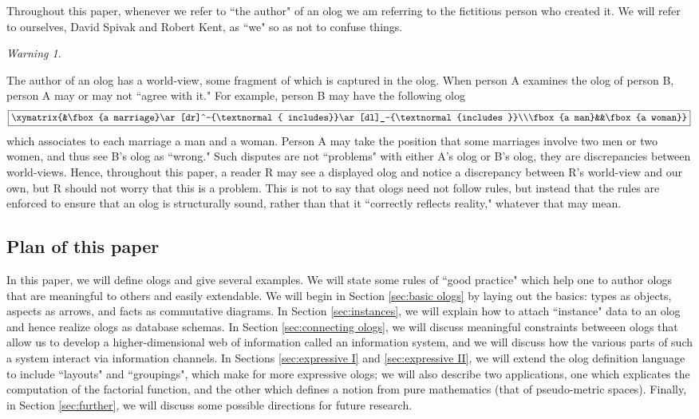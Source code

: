 \documentclass{amsart}
\newcommand{\LA}[2]{\ar[#1]^-{\tn {#2}}}
\newcommand{\LAL}[2]{\ar[#1]_-{\tn {#2}}}
\theoremstyle{remark}
\newtheorem{warning}[theorem]{Warning}
\theoremstyle{definition}
\def\tn{\textnormal}
\begin{document}
Throughout this paper, whenever we refer to ``the author" of an olog we am referring to the fictitious person who created it. We will refer to ourselves, David Spivak and Robert Kent, as ``we" so as not to confuse things. 

\begin{warning}\label{warn:world-view}

The author of an olog has a world-view, some fragment of which is captured in the olog. When person A examines the olog of person B, person A may or may not ``agree with it."  For example, person B may have the following olog $$\fbox{\xymatrix{&\fbox{a marriage}\LA{dr}{ includes}\LAL{dl}{includes }\\\fbox{a man}&&\fbox{a woman}}}$$ which associates to each marriage a man and a woman. Person A may take the position that some marriages involve two men or two women, and thus see B's olog as ``wrong."  Such disputes are not ``problems" with either A's olog or B's olog, they are discrepancies between world-views. Hence, throughout this paper, a reader R may see a displayed olog and notice a discrepancy between R's world-view and our own, but R should not worry that this is a problem. This is not to say that ologs need not follow rules, but instead that the rules are enforced to ensure that an olog is structurally sound, rather than that it ``correctly reflects reality," whatever that may mean.

\end{warning}

\subsection{Plan of this paper}

In this paper, we will define ologs and give several examples. We will state some rules of ``good practice" which help one to author ologs that are meaningful to others and easily extendable. We will begin in Section \ref{sec:basic ologs} by laying out the basics: types as objects, aspects as arrows, and facts as commutative diagrams. In Section \ref{sec:instances}, we will explain how to attach ``instance" data to an olog and hence realize ologs as database schemas. In Section \ref{sec:connecting ologs}, we will discuss meaningful constraints betweeen ologs that allow us to develop a higher-dimensional web of information called an information system, and we will discuss how the various parts of such a system interact via information channels. In Sections \ref{sec:expressive I} and \ref{sec:expressive II}, we will extend the olog definition language to include ``layouts" and ``groupings", which make for more expressive ologs; we will also describe two applications, one which explicates the computation of the factorial function, and the other which defines a notion from pure mathematics (that of pseudo-metric spaces). Finally, in Section \ref{sec:further}, we will discuss some possible directions for future research.
\end{document}
